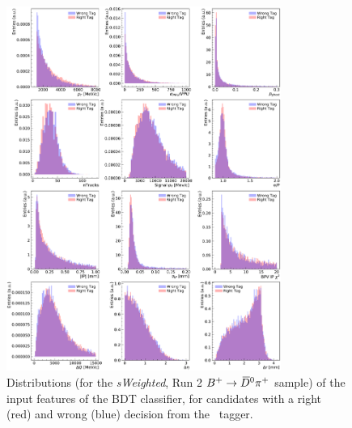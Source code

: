 \begin{figure}[htbp]
        \begin{center}
        \includegraphics[width=0.8\textwidth]{04Flavourtagging/figs/OSelectronOpt/2018-04-07-vibattis-OSElectron-bdt-calibration-sWeights_Run2_Bu2D0pi/FeaturesDistribution_RunIIcuts.pdf}
        \end{center}
        \vspace{-2mm}
        \caption{Distributions (for the \emph{sWeighted}, Run 2 $B^+\rightarrow \kern 0.2em\overline{\kern -0.2em D}{}^0 \pi^+$ sample) of the input features of the BDT classifier, for candidates with a right (red) and wrong (blue) decision from the \OSe~tagger.}
         \label{fig:OSefeaturesRunIIB2OC}
\end{figure}

